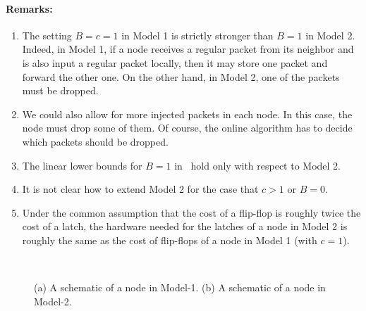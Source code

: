 \documentclass[11pt]{article}
\newenvironment{proof sketch}[1]{\noindent {\emph{Proof sketch of #1:}}}{\hfill \qed}
\begin{document}
\paragraph{Remarks:}
\begin{enumerate}
\item The setting $B=c=1$ in Model 1 is strictly stronger than $B=1$ in Model 2.
  Indeed, in Model 1, if a node receives a regular packet from its neighbor and is
  also input a regular packet locally, then it may store one packet and forward the
  other one.  On the other hand, in Model 2, one of the packets must be dropped.

\item We could also allow for more injected packets in each node. In
  this case, the node must drop some of them. Of course, the online
  algorithm has to decide which packets should be dropped.
\item The linear lower bounds for $B=1$ in~\cite{AZ,AKK} hold only with
  respect to Model 2.
\item It is not clear how to extend Model 2 for the case that $c>1$ or $B=0$.
\item Under the common assumption that the cost of a flip-flop is
  roughly twice the cost of a latch, the hardware needed for the
  latches of a node in Model 2 is roughly the same as the cost of
  flip-flops of a node in Model 1 (with $c=1$).
\end{enumerate}

\begin{figure}[h!]\centering
  \\
  \caption{(a) A schematic of a node in Model-1. (b) A schematic of a node in Model-2.}
\end{figure}
\end{document}
